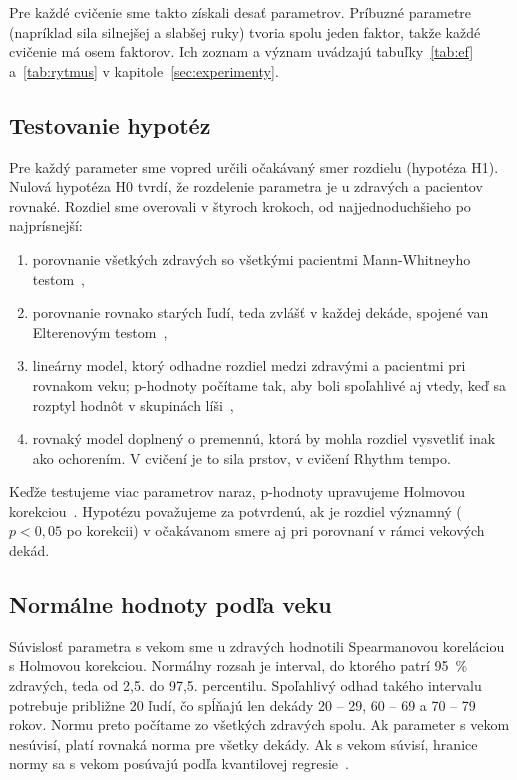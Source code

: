 \documentclass[12pt,a4paper]{article}
\begin{document}
Pre každé cvičenie sme takto získali desať parametrov. Príbuzné parametre (napríklad sila silnejšej a slabšej ruky)
tvoria spolu jeden faktor, takže každé cvičenie má osem faktorov. Ich zoznam
a význam uvádzajú tabuľky~\ref{tab:ef} a~\ref{tab:rytmus} v kapitole~\ref{sec:experimenty}.

\subsection{Testovanie hypotéz}

Pre každý parameter sme vopred určili očakávaný smer rozdielu (hypotéza H1). Nulová hypotéza H0 tvrdí, že rozdelenie
parametra je u zdravých a pacientov rovnaké. Rozdiel sme overovali v štyroch krokoch, od najjednoduchšieho po
najprísnejší:
\begin{enumerate}
  \item porovnanie všetkých zdravých so všetkými pacientmi Mann-Whitneyho testom~\cite{mann1947},
  \item porovnanie rovnako starých ľudí, teda zvlášť v každej dekáde, spojené van Elterenovým testom~\cite{vanelteren1960},
  \item lineárny model, ktorý odhadne rozdiel medzi zdravými a pacientmi pri rovnakom veku; p-hodnoty počítame
        tak, aby boli spoľahlivé aj vtedy, keď sa rozptyl hodnôt v skupinách líši~\cite{mackinnon1985},
  \item rovnaký model doplnený o premennú, ktorá by mohla rozdiel vysvetliť inak ako ochorením. V cvičení \ef{} je to
        sila prstov, v cvičení Rhythm tempo.
\end{enumerate}
Keďže testujeme viac parametrov naraz, p-hodnoty upravujeme Holmovou korekciou~\cite{holm1979}. Hypotézu považujeme
za potvrdenú, ak je rozdiel významný ($p < 0{,}05$ po korekcii) v očakávanom smere aj pri porovnaní v rámci vekových dekád.

\subsection{Normálne hodnoty podľa veku}

Súvislosť parametra s vekom sme u zdravých hodnotili Spearmanovou koreláciou s Holmovou korekciou. Normálny rozsah
je interval, do ktorého patrí 95~\% zdravých, teda od 2,5. do 97,5. percentilu. Spoľahlivý odhad takého intervalu
potrebuje približne 20 ľudí, čo spĺňajú len dekády 20 -- 29, 60 -- 69 a 70 -- 79 rokov. Normu preto počítame zo
všetkých zdravých spolu.
Ak parameter s vekom nesúvisí, platí rovnaká norma pre všetky dekády. Ak s vekom súvisí, hranice normy sa s vekom
posúvajú podľa kvantilovej regresie~\cite{koenker1978}.
\end{document}
